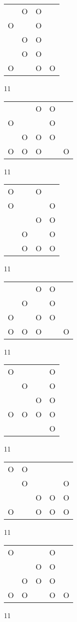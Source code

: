 \begin{tabular}{|m{0.2cm}m{0.2cm}m{0.2cm}m{0.2cm}|}\hline
 &O&O& \\
O& &O& \\
 &O&O& \\
 &O&O& \\
O& &O&O\\
\hline\end{tabular}11
\begin{tabular}{|m{0.2cm}m{0.2cm}m{0.2cm}m{0.2cm}m{0.2cm}|}\hline
 & &O&O& \\
O& & &O& \\
 &O&O&O& \\
O&O&O& &O\\
\hline\end{tabular}11
\begin{tabular}{|m{0.2cm}m{0.2cm}m{0.2cm}m{0.2cm}|}\hline
O& &O& \\
O& & &O\\
 & &O&O\\
 &O& &O\\
 &O&O&O\\
\hline\end{tabular}11
\begin{tabular}{|m{0.2cm}m{0.2cm}m{0.2cm}m{0.2cm}m{0.2cm}|}\hline
 & &O&O& \\
 &O& &O& \\
O& &O&O& \\
O&O&O& &O\\
\hline\end{tabular}11
\begin{tabular}{|m{0.2cm}m{0.2cm}m{0.2cm}m{0.2cm}|}\hline
O& & &O\\
 &O& &O\\
 & &O&O\\
O&O&O&O\\
 & & &O\\
\hline\end{tabular}11
\begin{tabular}{|m{0.2cm}m{0.2cm}m{0.2cm}m{0.2cm}m{0.2cm}|}\hline
O&O& & & \\
 &O& & &O\\
 & &O&O&O\\
O& &O&O&O\\
\hline\end{tabular}11
\begin{tabular}{|m{0.2cm}m{0.2cm}m{0.2cm}m{0.2cm}m{0.2cm}|}\hline
O& & &O& \\
 & &O&O& \\
 &O&O&O& \\
O&O& &O&O\\
\hline\end{tabular}11
